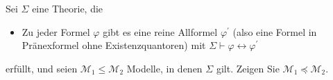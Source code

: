 
\begin{exercise}[146]
Sei $\Sigma$ eine Theorie, die
\begin{itemize}
  \item Zu jeder Formel $\varphi$ gibt es eine reine Allformel $\varphi^{\prime}$
  (also eine Formel in Pränexformel ohne Existenzquantoren) mit
  $\Sigma \vdash \varphi \leftrightarrow \varphi^{\prime}$
\end{itemize}
erfüllt, und seien $\mathscr{M}_1 \leq \mathscr{M}_2$ Modelle, in denen $\Sigma$ gilt.
Zeigen Sie $\mathscr{M}_1 \preccurlyeq \mathscr{M}_2$.
\end{exercise}


